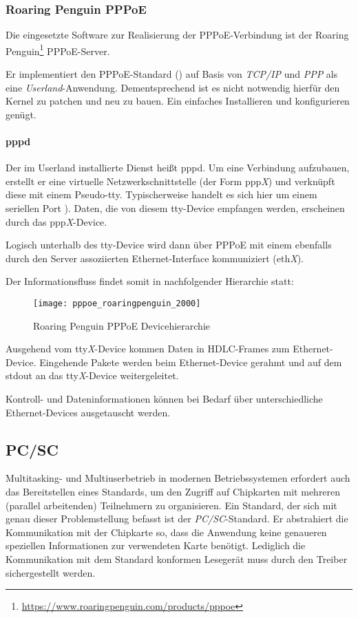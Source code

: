\subsubsection[Roaring Penguin PPPoE (Schenkel)]{Roaring Penguin PPPoE}
Die eingesetzte Software zur Realisierung der PPPoE-Verbindung ist der
Roaring Penguin\footnote{\url{https://www.roaringpenguin.com/products/pppoe}} PPPoE-Server.

Er implementiert den PPPoE-Standard () auf Basis
von \textit{TCP/IP} und \textit{PPP} als eine \textit{Userland}-Anwendung.
Dementsprechend ist es nicht notwendig hierfür den Kernel zu patchen und neu zu bauen.
Ein einfaches Installieren und konfigurieren genügt.

\paragraph{pppd}
Der im Userland installierte Dienst heißt pppd. Um eine Verbindung aufzubauen,
erstellt er eine virtuelle Netzwerkschnittstelle (der Form ppp\textit{X}) und verknüpft diese
mit einem Pseudo-\ac{tty}. %
Typischerweise handelt es sich hier um einem seriellen Port \cite{roaringpenguinpres}).
Daten, die von diesem tty-Device empfangen werden, erscheinen durch das ppp\textit{X}-Device.

Logisch unterhalb des tty-Device wird dann über PPPoE mit einem ebenfalls durch den Server
assoziierten Ethernet-Interface kommuniziert (eth\textit{X}).

Der Informationsfluss findet somit in nachfolgender Hierarchie statt:
 \begin{figure}[htp]
  \begin{center}
   \texttt{[image: pppoe\_roaringpenguin\_2000]}
  \end{center}
  \caption[Roaring Penguin PPPoE Devicehierarchie]{Roaring Penguin PPPoE Devicehierarchie \cite{roaringpenguinpres}}
  \label{fig:pppoe_roaringpenguin_devicehierarchy}
 \end{figure}

Ausgehend vom tty\textit{X}-Device kommen Daten in \ac{HDLC}-Frames zum Ethernet-Device.
Eingehende Pakete werden beim Ethernet-Device gerahmt und auf dem stdout an
das tty\textit{X}-Device weitergeleitet.

Kontroll- und Dateninformationen können bei Bedarf über unterschiedliche
Ethernet-Devices ausgetauscht werden.

\subsection[PC/SC (Schenkel)]{PC/SC}
Multitasking- und Multiuserbetrieb in modernen Betriebssystemen erfordert
auch das Bereitstellen eines Standards, um den Zugriff auf Chipkarten
mit mehreren (parallel arbeitenden) Teilnehmern zu organisieren. Ein Standard, der sich mit genau
dieser Problemstellung befasst ist der \textit{\ac{PC/SC}}-Standard.
Er abstrahiert die Kommunikation mit der Chipkarte so,
dass die Anwendung keine genaueren speziellen Informationen zur verwendeten
Karte benötigt. Lediglich die Kommunikation mit dem Standard
konformen Lesegerät muss durch den Treiber sichergestellt werden.

